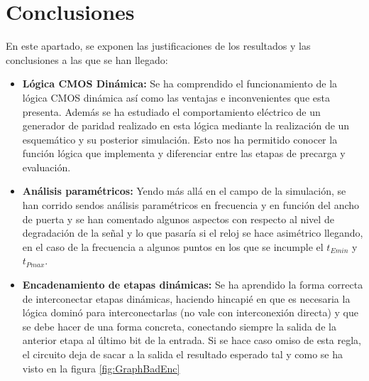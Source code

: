 \renewcommand{\baselinestretch}{0.5}
\chapter{Conclusiones}\label{ch:ch4label}
En este apartado, se exponen las justificaciones de los resultados y las conclusiones a las que se han llegado:
\begin{itemize}
    \item \textbf{Lógica CMOS Dinámica:} Se ha comprendido el funcionamiento de la lógica CMOS dinámica así como las ventajas e inconvenientes que esta presenta. Además se ha estudiado el comportamiento eléctrico de un generador de paridad realizado en esta lógica mediante la realización de un esquemático y su posterior simulación. Esto nos ha permitido conocer la función lógica que implementa y diferenciar entre las etapas de precarga y evaluación.
    \item \textbf{Análisis paramétricos:} Yendo más allá en el campo de la simulación, se han corrido sendos análisis paramétricos en frecuencia y en función del ancho de puerta y se han comentado algunos aspectos con respecto al nivel de degradación de la señal y lo que pasaría si el reloj se hace asimétrico llegando, en el caso de la frecuencia a algunos puntos en los que se incumple el $t_{Emin}$ y $t_{Pmax}$.
    \item \textbf{Encadenamiento de etapas dinámicas:} Se ha aprendido la forma correcta de interconectar etapas dinámicas, haciendo hincapié en que es necesaria la lógica dominó para interconectarlas (no vale con interconexión directa) y que se debe hacer de una forma concreta, conectando siempre la salida de la anterior etapa al último bit de la entrada. Si se hace caso omiso de esta regla, el circuito deja de sacar a la salida el resultado esperado tal y como se ha visto en la figura \ref{fig:GraphBadEnc}
\end{itemize}
